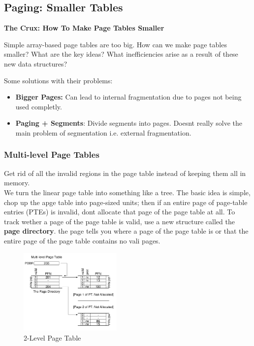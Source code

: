\subsection{Paging: Smaller Tables}

\begin{tcolorbox}
    \begin{center}
        \textbf{The Crux: How To Make Page Tables Smaller}
    \end{center}

    Simple array-based page tables are too big. How can we make page tables
    smaller? What are the key ideas? What inefficiencies arise as a result of
    these new data structures?
\end{tcolorbox}

Some solutions with their problems:

\begin{itemize}
    \item \textbf{Bigger Pages:} Can lead to internal fragmentation due to
        pages not being used completly.
    \item \textbf{Paging + Segments}: Divide segments into pages. Doesnt really
        solve the main problem of segmentation i.e. external fragmentation.
\end{itemize}

\subsubsection{Multi-level Page Tables}

Get rid of all the invalid regions in the page table instead of keeping them
all in memory.\\

We turn the linear page table into something like a tree. The basic idea is 
simple, chop up the apge table into page-sized units; then if an entire page of
page-table entries (PTEs) is invalid, dont allocate that page of the page table
at all. To track wether a page of the page table is valid, use a new structure
called the \textbf{page directory}. the page tells you where a page of the
page table is or that the entire page of the page table contains no
vali pages.

\begin{figure}[h!]
    \begin{center}
        \includegraphics[width=5cm]{img/203.png}
        \caption{2-Level Page Table}
    \end{center}
\end{figure}

